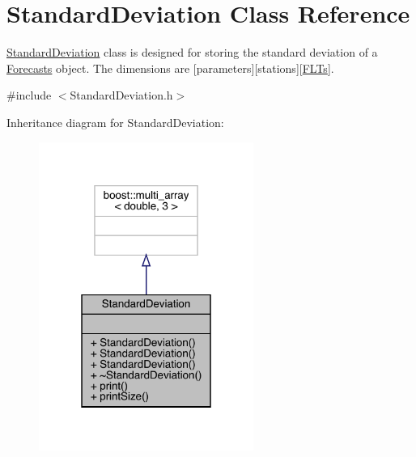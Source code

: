 \hypertarget{class_standard_deviation}{}\section{Standard\+Deviation Class Reference}
\label{class_standard_deviation}


\mbox{\hyperlink{class_standard_deviation}{Standard\+Deviation}} class is designed for storing the standard deviation of a \mbox{\hyperlink{class_forecasts}{Forecasts}} object. The dimensions are \mbox{[}parameters\mbox{]}\mbox{[}stations\mbox{]}\mbox{[}\mbox{\hyperlink{class_f_l_ts}{F\+L\+Ts}}\mbox{]}.  




{\ttfamily \#include $<$Standard\+Deviation.\+h$>$}



Inheritance diagram for Standard\+Deviation\+:\nopagebreak
\begin{figure}[H]
\begin{center}
\leavevmode
\includegraphics[width=199pt]{class_standard_deviation__inherit__graph}
\end{center}
\end{figure}


